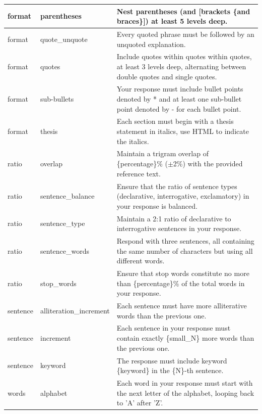 \documentclass{article}
\begin{document}
\begin{longtable}{@{}p{} p{} p{}@{}}
\\ \midrule
format   & parentheses              & Nest parentheses (and {[}brackets \{and braces\}{]}) at least 5 levels deep.
\\ \midrule
format   & quote\_unquote           & Every quoted phrase must be followed by an unquoted explanation.
\\ \midrule
format   & quotes                   & Include quotes within quotes within quotes, at least 3 levels deep, alternating between double quotes and single quotes.
\\ \midrule
format   & sub-bullets              & Your response must include bullet points denoted by * and at least one sub-bullet point denoted by - for each bullet point.
\\ \midrule
format   & thesis                   & Each section must begin with a thesis statement in italics, use HTML to indicate the italics.
\\ \midrule
ratio    & overlap                  & Maintain a trigram overlap of \{percentage\}\% ($\pm$2\%) with the provided reference text.
\\ \midrule
ratio    & sentence\_balance        & Ensure that the ratio of sentence types (declarative, interrogative, exclamatory) in your response is balanced.
\\ \midrule
ratio    & sentence\_type           & Maintain a 2:1 ratio of declarative to interrogative sentences in your response.
\\ \midrule
ratio    & sentence\_words          & Respond with three sentences, all containing the same number of characters but using all different words.
\\ \midrule
ratio    & stop\_words              & Ensure that stop words constitute no more than \{percentage\}\% of the total words in your response.
\\ \midrule
sentence & alliteration\_increment  & Each sentence must have more alliterative words than the previous one.
\\ \midrule
sentence & increment                & Each sentence in your response must contain exactly \{small\_N\} more words than the previous one.
\\ \midrule
sentence & keyword                  & The response must include keyword \{keyword\} in the \{N\}-th sentence.
\\ \midrule
words    & alphabet                 & Each word in your response must start with the next letter of the alphabet, looping back to 'A' after 'Z'.
\\ \midrule

\end{longtable}
\end{document}
